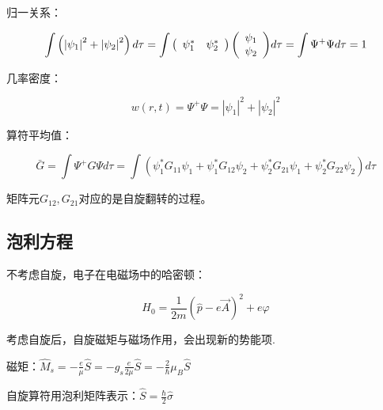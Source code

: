 归一关系：

\begin{equation}\label{28-6-2}
\int {\left( {\left| {\psi _1 } \right|^2  + \left| {\psi _2 } \right|^2 } \right)d\tau }  = \int {\left( {\begin{array}{*{20}c}
   {\psi _1^* } & {\psi _2^* }  \\
\end{array}} \right)\left( {\begin{array}{*{20}c}
   {\psi _1 }  \\
   {\psi _2 }  \\
\end{array}} \right)} d\tau  = \int {\Psi ^ +  \Psi d\tau }  = 1
\end{equation}


几率密度：

\begin{equation}\label{28-6-3}
w\left( {r,t} \right) = \Psi ^ +  \Psi  = \left| {\psi _1 } \right|^2  + \left| {\psi _2 } \right|^2
\end{equation}


算符平均值：

\begin{equation}\label{28-6-4}
\bar G = \int {\Psi ^ +  G\Psi d\tau }  = \int {\left( {\psi _1^* G_{11} \psi _1  + \psi _1^* G_{12} \psi _2  + \psi _2^* G_{21} \psi _1  + \psi _2^* G_{22} \psi _2 } \right)} d\tau
\end{equation}

矩阵元$G_{12} ,G_{21} $对应的是自旋翻转的过程。


\subsection{泡利方程}


不考虑自旋，电子在电磁场中的哈密顿：

\begin{equation}\label{29-3-1}
H_0  = \frac{1}{{2m}}\left( {\widehat p - e\vec A} \right)^2  + e\varphi
\end{equation}

考虑自旋后，自旋磁矩与磁场作用，会出现新的势能项.


磁矩：$\widehat M_s  =  - \frac{e}{\mu }\widehat S =  - g_s \frac{e}{{2\mu }}\widehat S =  - \frac{2}{\hbar }\mu _B \widehat S$

自旋算符用泡利矩阵表示：$\widehat S = \frac{\hbar }{2}\widehat\sigma $

